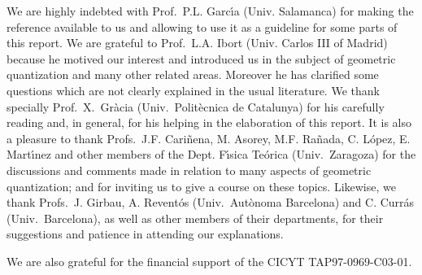 \documentclass[12pt]{article}
\theoremstyle{plain}
\begin{document}
We are highly indebted with Prof.\ P.L. Garc\'{\i}a (Univ. Salamanca)
for making the reference \cite{Ga-83} available to us and allowing to
use it
as a guideline for some parts of this report.
We are grateful to Prof.\ L.A. Ibort (Univ. Carlos III of Madrid)
because he motived our interest and introduced us
in the subject of geometric quantization and many
other related areas. Moreover he has clarified some questions
which are not clearly explained in the usual literature.
We thank specially Prof.\ X.~Gr\`acia (Univ.\ Polit\`ecnica de
Catalunya)
for his carefully reading and, in general, for his helping in the
elaboration of this report.
It is also a pleasure to thank
Profs.\ J.F. Cari\~nena, M. Asorey, M.F. Ra\~nada, C. L\'opez, E.
Mart\'{\i}nez
and other members of the Dept. F\'{\i}sica Te\'orica (Univ.\ Zaragoza)
for the discussions and comments made in relation
to many aspects of geometric quantization;
and for inviting us to give a course on these topics.
Likewise, we thank
Profs.\ J. Girbau, A. Revent\'os (Univ.\ Aut\`onoma Barcelona)
and C. Curr\'as (Univ.\ Barcelona),
as well as other members of their departments,
for their suggestions and patience in attending our explanations.

We are also grateful for the financial support
of the CICYT TAP97-0969-C03-01.
\end{document}
